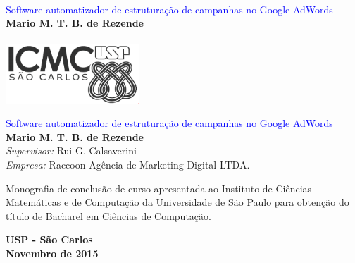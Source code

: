 \documentclass[12pt,times,a4paper,twoside]{icmc}
\newcommand{\tituloMonografia}{Software automatizador de
estruturação de campanhas no Google AdWords}
\newcommand{\nomeAluno}{Mario M. T. B. de Rezende}
\newcommand{\nomeSupervisor}{Rui G. Calsaverini}
\newcommand{\nomeEmpresa}{Raccoon Agência de Marketing Digital
LTDA.}
\begin{document}

\begin{titlepage}   
	\pagestyle{empty} %

	\begin{center} 
    \begin{minipage}[c]{12cm}
    \begin{center}
      \vspace{.35\textheight}
      \hrulefill\\
      \vspace{.5cm} {\Large \textcolor{blue}{\tituloMonografia}}\\
      \vspace{1.3cm}
      \textbf{\nomeAluno}\\
      \vspace{.5cm}
      \hrulefill\\
    \vspace{5cm}
    \includegraphics[width=5cm]{img/logoICMC.png}
    \end{center}
    \end{minipage}
  \end{center} 
  

  \cleardoublepage
 

  \vspace*{3cm}
  \begin{center}
    {\huge\sf \textcolor{blue}{\tituloMonografia}} \\
    \vspace*{2cm}
    {\bf \nomeAluno} \\
    \vspace*{2cm}
    \emph{Supervisor:}  {\nomeSupervisor}\\
    \emph{Empresa:}  {\nomeEmpresa}
  \end{center}
  \vspace*{3cm}

  \begin{flushright}
    \begin{minipage}{10cm}
      Monografia de conclusão de curso apresentada ao
Instituto de Ciências Matemáticas e de Computação da Universidade de São Paulo para obtenção do título de Bacharel em
Ciências de Computação.
    \end{minipage}
  \end{flushright}

  \vspace*{2cm}
  \begin{center}
    \textbf{USP - São Carlos \\ Novembro de 2015}
  \end{center}
  
  \cleardoublepage  
  
\end{titlepage}
\end{document}
